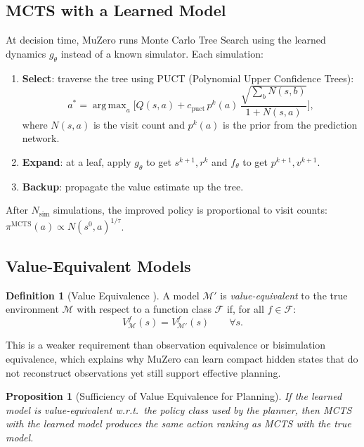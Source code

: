\documentclass[11pt,a4paper]{article}
\newtheorem{proposition}[theorem]{Proposition}
\theoremstyle{definition}
\newtheorem{definition}[theorem]{Definition}
\DeclareMathOperator*{\argmax}{arg\,max}
\begin{document}
\subsection{MCTS with a Learned Model}

At decision time, MuZero runs Monte Carlo Tree Search using the learned
dynamics $g_\theta$ instead of a known simulator. Each simulation:
\begin{enumerate}
  \item \textbf{Select}: traverse the tree using PUCT (Polynomial Upper
    Confidence Trees):
    \begin{equation}\label{eq:puct}
      a^* = \argmax_a\!\Big[
        Q(s,a) + c_{\text{puct}}\, p^k(a)\,
        \frac{\sqrt{\sum_b N(s,b)}}{1 + N(s,a)}
      \Big],
    \end{equation}
    where $N(s,a)$ is the visit count and $p^k(a)$ is the prior from
    the prediction network.
  \item \textbf{Expand}: at a leaf, apply $g_\theta$ to get $s^{k+1},
    r^k$ and $f_\theta$ to get $p^{k+1}, v^{k+1}$.
  \item \textbf{Backup}: propagate the value estimate up the tree.
\end{enumerate}

After $N_{\text{sim}}$ simulations, the improved policy is proportional
to visit counts: $\pi^{\mathrm{MCTS}}(a) \propto N(s^0, a)^{1/\tau}$.

\subsection{Value-Equivalent Models}

\begin{definition}[Value Equivalence \cite{grimm2020value}]
A model $\mathcal{M}'$ is \emph{value-equivalent} to the true
environment $\mathcal{M}$ with respect to a function class
$\mathcal{F}$ if, for all $f \in \mathcal{F}$:
\begin{equation}
  V_{\mathcal{M}}^f(s) = V_{\mathcal{M}'}^f(s) \qquad \forall s.
\end{equation}
\end{definition}

This is a weaker requirement than observation equivalence or
bisimulation equivalence, which explains why MuZero can learn compact
hidden states that do not reconstruct observations yet still support
effective planning.

\begin{proposition}[Sufficiency of Value Equivalence for Planning]
If the learned model is value-equivalent w.r.t.\ the policy class used
by the planner, then MCTS with the learned model produces the same
action ranking as MCTS with the true model.
\end{proposition}
\end{document}
